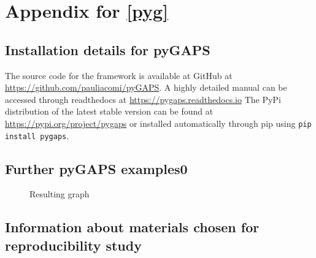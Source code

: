 
\graphicspath{ {\thisch/figures/} }

\chapter{Appendix for \autoref{pyg}}%
\label{appx:pyg}


\section{Installation details for pyGAPS}

The source code for the framework is available at GitHub
at \url{https://github.com/pauliacomi/pyGAPS}. A highly detailed 
manual can be accessed through readthedocs
at \url{https://pygaps.readthedocs.io}
The PyPi distribution of the latest stable version can be found at
\url{https://pypi.org/project/pygaps}
or installed automatically through pip using \lstinline{pip install pygaps}.

\section{Further pyGAPS examples0}\label{appx:pyg:examples}

\begin{figure}[H]
    \caption{Resulting graph}\label{appx:pyg:print_info}

\end{figure}

\section{Information about materials chosen for reproducibility study}

